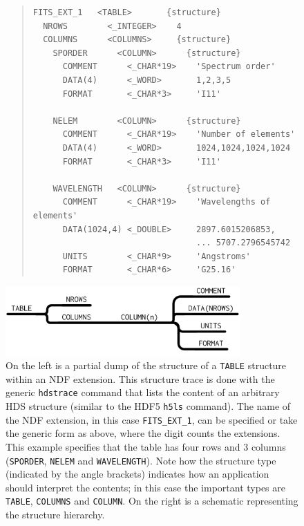 \documentclass[final,authoryear,5p,times,twocolumn]{elsarticle}
\begin{document}
\begin{figure}[t]
\begin{minipage}{0.5\textwidth}
\begin{quote}
\small
\begin{verbatim}
FITS_EXT_1   <TABLE>       {structure}
  NROWS        <_INTEGER>    4
  COLUMNS      <COLUMNS>     {structure}
    SPORDER      <COLUMN>      {structure}
      COMMENT      <_CHAR*19>    'Spectrum order'
      DATA(4)      <_WORD>       1,2,3,5
      FORMAT       <_CHAR*3>     'I11'

    NELEM        <COLUMN>      {structure}
      COMMENT      <_CHAR*19>    'Number of elements'
      DATA(4)      <_WORD>       1024,1024,1024,1024
      FORMAT       <_CHAR*3>     'I11'

    WAVELENGTH   <COLUMN>      {structure}
      COMMENT      <_CHAR*19>    'Wavelengths of elements'
      DATA(1024,4) <_DOUBLE>     2897.6015206853,
                                 ... 5707.2796545742
      UNITS        <_CHAR*9>     'Angstroms'
      FORMAT       <_CHAR*6>     'G25.16'
\end{verbatim}
\end{quote}
\end{minipage}
\begin{minipage}[t]{0.48\textwidth}
\begin{center}
\includegraphics[width=0.8\textwidth]{model-table}
\end{center}
\end{minipage}
\caption{On the left is a partial dump of the structure of a \texttt{TABLE} structure
within an NDF extension. This structure trace is done with the generic
\texttt{hdstrace} command that lists the content of an arbitrary HDS
structure (similar to the HDF5 \texttt{h5ls} command).
 The name of the NDF extension, in this case \texttt{FITS\_EXT\_1}, can be specified
or take the generic form as above, where the digit counts the
extensions. This example specifies that the table has four rows and 3
columns (\texttt{SPORDER}, \texttt{NELEM} and \texttt{WAVELENGTH}). Note
how the structure type (indicated by the angle brackets) indicates how
an application should interpret the contents; in this case the
important types are \texttt{TABLE}, \texttt{COLUMNS} and
\texttt{COLUMN}. On the right is a schematic representing the
structure hierarchy.}
\label{fig:hdstable}
\end{figure}
\end{document}
